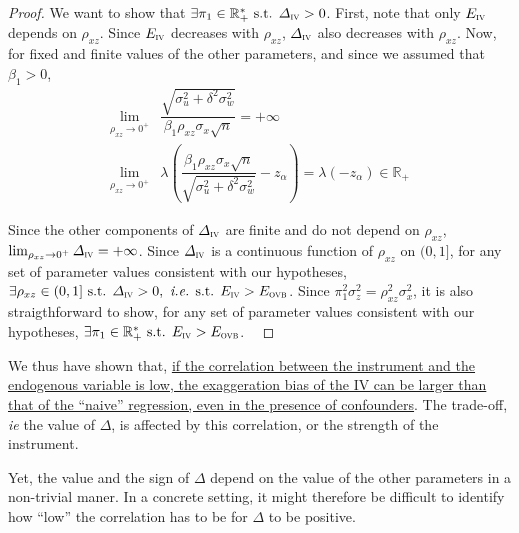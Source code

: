 \documentclass[a4paper, 11pt]{report}
\begin{document}
\begin{proof}
                                		We want to show that $\exists \pi_{1} \in \mathbb{R}_{+}^{*} \text{ s.t. } \varDelta_{\textsc{iv}} > 0$. First, note that only $E_{\textsc{iv}}$ depends on $\rho_{xz}$. Since $E_{\textsc{iv}}$ decreases with $\rho_{xz}$, $\varDelta_{\textsc{iv}}$ also decreases with $\rho_{xz}$. Now, for fixed and finite values of the other parameters, and since we assumed that $\beta_{1} > 0$,
                                		~
                                		\begin{align*}
                                			\lim_{\rho_{xz} \to 0^{+}} & \dfrac{\sqrt{\sigma_{u}^{2} +  \delta^{2} \sigma_{w}^{2}}}{\beta_{1}\rho_{xz} \sigma_{x}\sqrt{n}} = + \infty \\
                                			\lim_{\rho_{xz} \to 0^{+}} & \lambda \left( \dfrac{\beta_{1}\rho_{xz} \sigma_{x}\sqrt{n}}{\sqrt{\sigma_{u}^{2} +  \delta^{2} \sigma_{w}^{2} }} - z_{\alpha} \right) = \lambda (- z_{\alpha}) \in \mathbb{R}_{+}
                                		\end{align*}
                                			
                                		Since the other components of $\varDelta_{\textsc{iv}}$ are finite and do not depend on $\rho_{xz}$, $\lim_{\rho_{xz} \to 0^{+}} \varDelta_{\textsc{iv}} = + \infty$. Since $\varDelta_{\textsc{iv}}$ is a continuous function of $\rho_{xz}$ on $(0, 1]$, for any set of parameter values consistent with our hypotheses, $\exists \rho_{xz} \in (0, 1] \text{ s.t. } \varDelta_{\textsc{iv}} > 0, \text{ \textit{i.e.} s.t. }E_{\textsc{iv}} > E_{\textsc{ovb}}$. Since $\pi_{1}^{2}\sigma_{z}^{2} = \rho_{xz}^{2}\sigma_{x}^{2}$, it is also straigthforward to show, for any set of parameter values consistent with our hypotheses, $\exists \pi_{1} \in \mathbb{R}_{+}^{*} \text{ s.t. } E_{\textsc{iv}} > E_{\textsc{ovb}}$. 
            			~
            			\end{proof}
                                		
                                		We thus have shown that, \ul{if the correlation between the instrument and the endogenous variable is low, the exaggeration bias of the IV can be larger than that of the ``naive'' regression, even in the presence of confounders}. The trade-off, \textit{ie} the value of $\varDelta$, is affected by this correlation, or the strength of the instrument. 
            		
            		
            		Yet, the value and the sign of $\varDelta$ depend on the value of the other parameters in a non-trivial maner. In a concrete setting, it might therefore be difficult to identify how ``low'' the correlation has to be for $\varDelta$ to be positive. 
		
\end{document}
